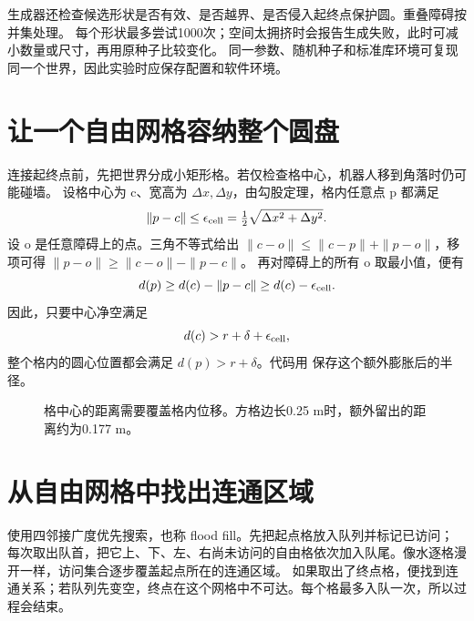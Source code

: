 生成器还检查候选形状是否有效、是否越界、是否侵入起终点保护圆。重叠障碍按并集处理。
每个形状最多尝试1000次；空间太拥挤时会报告生成失败，此时可减小数量或尺寸，再用原种子比较变化。
同一参数、随机种子和标准库环境可复现同一个世界，因此实验时应保存配置和软件环境。

\section{让一个自由网格容纳整个圆盘}
连接起终点前，先把世界分成小矩形格。若仅检查格中心，机器人移到角落时仍可能碰墙。
设格中心为 c、宽高为 $\Delta x,\Delta y$，由勾股定理，格内任意点 p 都满足
\begin{equation}
\|p-c\|\leq\epsilon_{\rm cell}=\tfrac12\sqrt{\Delta x^2+\Delta y^2}.
\end{equation}
设 o 是任意障碍上的点。三角不等式给出
$\|c-o\|\leq\|c-p\|+\|p-o\|$，移项可得
$\|p-o\|\geq\|c-o\|-\|p-c\|$。
再对障碍上的所有 o 取最小值，便有
\begin{equation}
d(p)\geq d(c)-\|p-c\|\geq d(c)-\epsilon_{\rm cell}.
\end{equation}
因此，只要中心净空满足
\begin{equation}
d(c)>r+\delta+\epsilon_{\rm cell},
\end{equation}
整个格内的圆心位置都会满足 $d(p)>r+\delta$。代码用  保存这个额外膨胀后的半径。
\begin{figure}[ht]
\centering
{}
\caption{格中心的距离需要覆盖格内位移。方格边长0.25 m时，额外留出的距离约为0.177 m。}
\end{figure}

\section{从自由网格中找出连通区域}
 使用四邻接广度优先搜索，也称 flood fill。先把起点格放入队列并标记已访问；
每次取出队首，把它上、下、左、右尚未访问的自由格依次加入队尾。像水逐格漫开一样，访问集合逐步覆盖起点所在的连通区域。
如果取出了终点格，便找到连通关系；若队列先变空，终点在这个网格中不可达。每个格最多入队一次，所以过程会结束。

